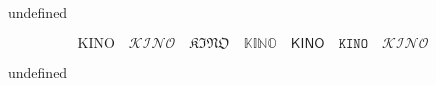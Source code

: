 undefined
\usepackage{amsmath,amssymb,mathrsfs} %


\[
    \mathrm{KINO}\quad        %
    \mathcal{KINO}\quad       %
    \mathfrak{KINO}\quad      %
    \mathbb{KINO}\quad        %
    \mathsf{KINO}\quad        %
    \mathtt{KINO}\quad        %
    \mathscr{KINO}\quad       %
\]



undefined
